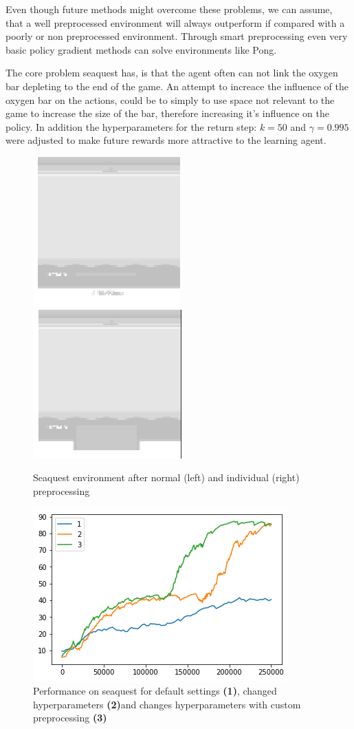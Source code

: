 Even though future methods might overcome these problems, we can assume, that a well preprocessed environment will always outperform if compared with a poorly or non preprocessed environment.
Through smart preprocessing even very basic policy gradient methods can solve environments like Pong.  \citep{karpathy}

The core problem seaquest has, is that the agent often can not link the oxygen bar depleting to the end of the game. 
An attempt to increace the influence of the oxygen bar on the actions, could be to simply to use space not relevant to the game to increase the size of the bar, therefore increasing it's influence on the policy.
In addition the hyperparameters for the return step: $k=50$ and $\gamma =0.995$ were adjusted to make future rewards more attractive to the learning agent.

\begin{figure}[h]
\includegraphics[scale=1]{bilder/seaquestgamenopre.png}
\includegraphics[scale=1]{bilder/seaquestgameprepro.png}
\caption{Seaquest environment after normal (left) and individual (right) preprocessing}
\end{figure}

\begin{figure}[h]
\includegraphics[scale=0.8]{bilder/seaquestprepro}
\caption{Performance on seaquest for default settings \textbf{(1)}, changed hyperparameters \textbf{(2)}and changes hyperparameters with custom preprocessing \textbf{(3)}}
\end{figure}

